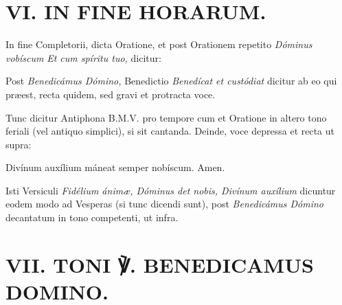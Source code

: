 \documentclass[vesperale_romanum.tex]{subfiles}
\begin{document}
\section[VI. In fine Horarum]{VI. IN FINE HORARUM.}

In fine Completorii, dicta Oratione, et post Orationem repetito \vv \textit{Dóminus vobíscum} \rr \textit{Et cum spíritu tuo,} dicitur:

Post \vv \textit{Benedicámus Dómino,} Benedictio \textit{Benedícat et custódiat} dicitur ab eo qui præest, recta quidem, sed gravi et protracta voce.

Tunc dicitur Antiphona B.M.V. pro tempore cum \vv et Oratione in altero tono feriali (vel antiquo simplici), si sit cantanda. Deinde, voce depressa et recta ut supra:

\vv Divínum auxílium máneat semper nobíscum. \rr Amen.

Isti Versiculi \textit{Fidélium ánimæ, Dóminus det nobis, Divínum auxílium} dicuntur eodem modo ad Vesperas (si tunc dicendi sunt), post \vv \textit{Benedicámus Dómino} decantatum in tono competenti, ut infra.

\section[VII. Toni ℣. Benedicamus Domino]{VII. TONI ℣. BENEDICAMUS DOMINO.}






%





\end{document}
